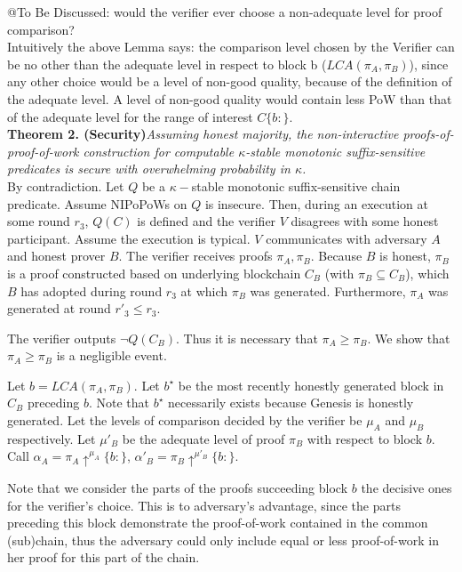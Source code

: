 \documentclass[11pt,a4paper]{article}
\begin{document}
@To Be Discussed: would the verifier ever choose a non-adequate level for proof comparison? \\
Intuitively the above Lemma says: the comparison level chosen by the Verifier can be no other than the adequate level in respect to block b ($LCA(\pi_A, \pi_B)$), since any other choice would be a level of non-good quality, because of the definition of the adequate level. A level of non-good quality would contain less PoW than that of the adequate level for the range of interest $C\{b:\}$. \\


\textbf{Theorem 2. (Security)}\textit{Assuming honest majority, the non-interactive proofs-of-proof-of-work construction for computable $\kappa$-stable monotonic suffix-sensitive predicates is secure with overwhelming probability in $\kappa$.}\\

By contradiction. Let $Q$ be a $\kappa-$stable monotonic suffix-sensitive chain predicate. Assume NIPoPoWs on $Q$ is insecure. Then, during an execution at some round  $r_3$, $Q(C)$ is defined and the verifier $V$ disagrees with some honest participant. Assume the execution is typical. $V$ communicates with adversary $A$ and honest prover $B$. The verifier receives proofs $\pi_A, \pi_B$. Because $B$ is honest, $\pi_B$ is a proof constructed based on underlying blockchain $C_B$ (with $\pi_B \subseteq C_B$), which $B$ has adopted during round $r_3$ at which $\pi_B$ was generated. Furthermore, $\pi_A$ was generated at round $r'_3 \leq r_3$.

The verifier outputs $\neg Q(C_B)$. Thus it is necessary that $\pi_A \geq \pi_B$. We show that $\pi_A \geq \pi_B$ is a negligible event. 

Let $b = LCA(\pi_A, \pi_B)$. Let $b^\star$ be the most recently honestly generated block in $C_B$ preceding $b$. Note that $b^\star$ necessarily exists because Genesis is honestly generated. Let the levels of comparison decided by the verifier be $\mu_A$ and $\mu_B$ respectively. Let $\mu'_B$ be the adequate level of proof $\pi_B$  with respect to block $b$. Call $\alpha_A = \pi_A \uparrow^{\mu_A}\{b:\}$, 
$\alpha'_B = \pi_B \uparrow^{\mu'_B}\{b:\}$.

Note that we consider the parts of the proofs succeeding block $b$ the decisive ones for the verifier's choice. This is to adversary's advantage, since the parts preceding this block demonstrate the proof-of-work contained in the common (sub)chain, thus the adversary could only include equal or less proof-of-work in her proof for this part of the chain.
\end{document}
